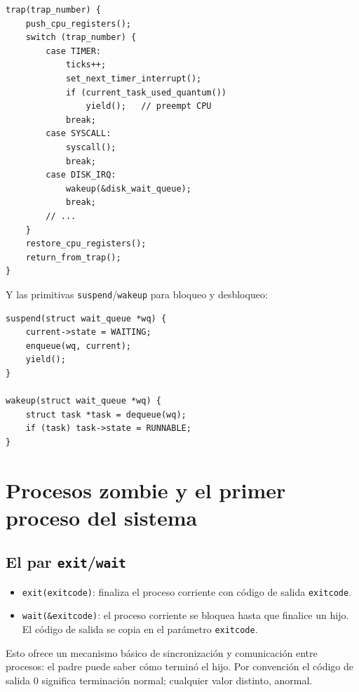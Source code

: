 \documentclass[11pt,a4paper]{article}
\begin{document}
\begin{lstlisting}[style=cstyle]
trap(trap_number) {
    push_cpu_registers();
    switch (trap_number) {
        case TIMER:
            ticks++;
            set_next_timer_interrupt();
            if (current_task_used_quantum())
                yield();   // preempt CPU
            break;
        case SYSCALL:
            syscall();
            break;
        case DISK_IRQ:
            wakeup(&disk_wait_queue);
            break;
        // ...
    }
    restore_cpu_registers();
    return_from_trap();
}
\end{lstlisting}

Y las primitivas \texttt{suspend}/\texttt{wakeup} para bloqueo y
desbloqueo:

\begin{lstlisting}[style=cstyle]
suspend(struct wait_queue *wq) {
    current->state = WAITING;
    enqueue(wq, current);
    yield();
}

wakeup(struct wait_queue *wq) {
    struct task *task = dequeue(wq);
    if (task) task->state = RUNNABLE;
}
\end{lstlisting}

\section{Procesos zombie y el primer proceso del sistema}

\subsection{El par \texttt{exit}/\texttt{wait}}

\begin{itemize}[leftmargin=*,nosep]
    \item \texttt{exit(exitcode)}: finaliza el proceso corriente con
        código de salida \texttt{exitcode}.
    \item \texttt{wait(\&exitcode)}: el proceso corriente se bloquea
        hasta que finalice un hijo. El código de salida se copia en
        el parámetro \texttt{exitcode}.
\end{itemize}

Esto ofrece un mecanismo básico de sincronización y comunicación
entre procesos: el padre puede saber cómo terminó el hijo. Por
convención el código de salida $0$ significa terminación normal;
cualquier valor distinto, anormal.
\end{document}
